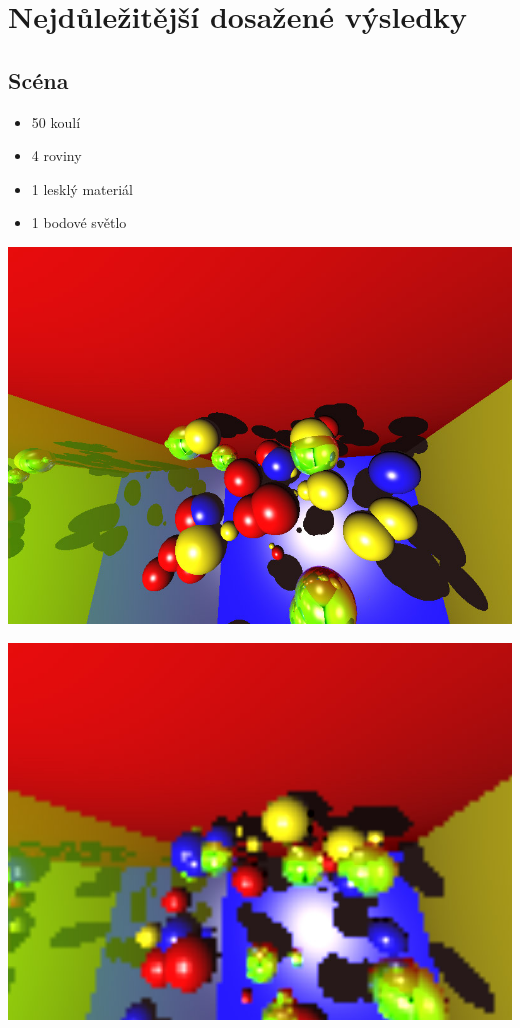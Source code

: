 \documentclass[12pt,a4paper,titlepage,final]{report}
\begin{document}
\section{Nejdůležitější dosažené výsledky}

\subsection{Scéna}
\begin{itemize}
	\item 50 koulí
	\item 4 roviny
	\item 1 lesklý materiál
	\item 1 bodové světlo
\end{itemize}

\begin{center}

	\captionsetup{type=figure}
		\includegraphics[width=14cm]{images/no-sampling-no-bvh.jpg}
	

	\captionsetup{type=figure}
		\includegraphics[width=14cm]{images/with-sampling-no-bvh.jpg}
\end{center}
\end{document}
